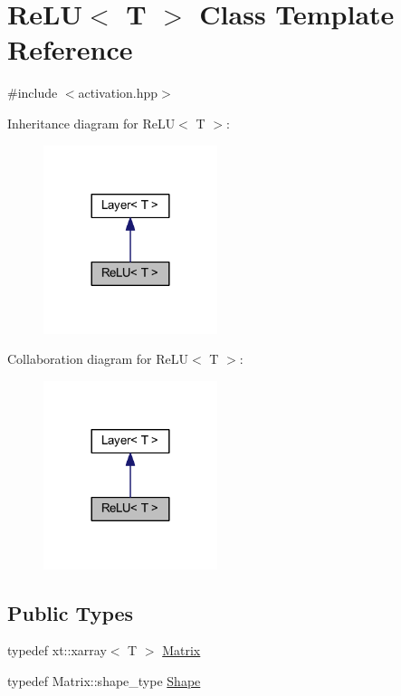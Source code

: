 \hypertarget{class_re_l_u}{}\section{Re\+LU$<$ T $>$ Class Template Reference}
\label{class_re_l_u}


{\ttfamily \#include $<$activation.\+hpp$>$}



Inheritance diagram for Re\+LU$<$ T $>$\+:\nopagebreak
\begin{figure}[H]
\begin{center}
\leavevmode
\includegraphics[width=144pt]{class_re_l_u__inherit__graph}
\end{center}
\end{figure}


Collaboration diagram for Re\+LU$<$ T $>$\+:\nopagebreak
\begin{figure}[H]
\begin{center}
\leavevmode
\includegraphics[width=144pt]{class_re_l_u__coll__graph}
\end{center}
\end{figure}
\subsection*{Public Types}
\begin{DoxyCompactItemize}
\item 
typedef xt\+::xarray$<$ T $>$ \mbox{\hyperlink{class_re_l_u_a3d1448f06335a4ab7227ec31a43a410f}{Matrix}}
\item 
typedef Matrix\+::shape\+\_\+type \mbox{\hyperlink{class_re_l_u_ae27e6aba0a09baa85b8ef8679db42719}{Shape}}
\end{DoxyCompactItemize}
